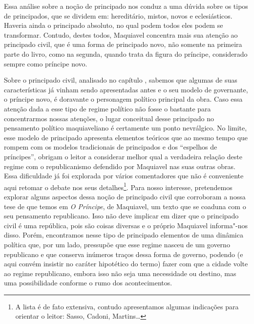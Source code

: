 Essa análise sobre a noção de principado nos conduz a uma dúvida sobre
os tipos de principados, que se dividem em: hereditário, mistos, novos e
eclesiásticos. Haveria ainda o principado absoluto, no qual podem todos
eles podem se transformar. Contudo, destes todos, Maquiavel concentra
mais sua atenção ao principado civil, que é uma forma de principado
novo, não somente na primeira parte do livro, como na segunda, quando
trata da figura do príncipe, considerado sempre como príncipe novo.

Sobre o principado civil, analisado no capítulo , sabemos que algumas
de suas características já vinham sendo apresentadas antes e o seu
modelo de governante, o príncipe novo, é doravante o personagem político
principal da obra. Caso essa atenção dada a esse tipo de regime político
não fosse o bastante para concentrarmos nossas atenções, o lugar
conceitual desse principado no pensamento político maquiaveliano é
certamente um ponto nevrálgico. No limite, esse modelo de principado
apresenta elementos teóricos que ao mesmo tempo que rompem com os
modelos tradicionais de principados e dos ``espelhos de príncipes'',
obrigam o leitor a considerar melhor qual a verdadeira relação deste
regime com o republicanismo defendido por Maquiavel nas suas outras
obras. Essa dificuldade já foi explorada por vários comentadores que não
é conveniente aqui retomar o debate nos seus detalhes\footnote{A lista é
  de fato extensiva, contudo apresentamos algumas indicações para
  orientar o leitor: Sasso, Cadoni, Martins\ldots{}}. Para nosso
interesse, pretendemos explorar alguns aspectos dessa noção de
principado civil que corroboram a nossa tese de que temos em \emph{O
Príncipe}, de Maquiavel, um texto que se coaduna com o seu pensamento
republicano. Isso não deve implicar em dizer que o principado civil é
uma república, pois são coisas diversas e o próprio Maquiavel
informa"-nos disso. Porém, encontramos nesse tipo de principado elementos
de uma dinâmica política que, por um lado, pressupõe que esse regime
nasceu de um governo republicano e que conserva inúmeros traços dessa
forma de governo, podendo (e aqui convém insistir no caráter hipotético
do termo) fazer com que a cidade volte ao regime republicano, embora
isso não seja uma necessidade ou destino, mas uma possibilidade conforme
o rumo dos acontecimentos.

